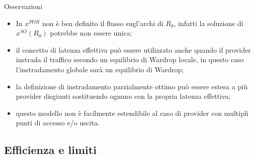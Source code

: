 \documentclass{beamer}
\theoremstyle{plain}
\theoremstyle{definition}
\theoremstyle{remark}
\begin{document}
\begin{frame}{Osservazioni}
  \begin{itemize}
  \item In $x^{POR}$ non è ben definito il flusso sugl'archi di $R_0$,
    infatti la soluzione di $x^{SO}(R_0)$ potrebbe non essere unica;
  \item il concetto di latenza effettiva può essere utilizzato anche
    quando il provider instrada il traffico secondo un equilibrio di
    Wardrop locale, in questo caso l'instradamento globale sarà un
    equilibrio di Wardrop;
  \item la definizione di instradamento parzialmente ottimo può essere
    estesa a più provider disgiunti sostituendo ognuno con la propria
    latenza effettiva;
  \item questo modello non è facilmente estendibile al caso di
    provider con multipli punti di accesso e/o uscita.
  \end{itemize}
\end{frame}

\subsection{Efficienza e limiti}
\end{document}

